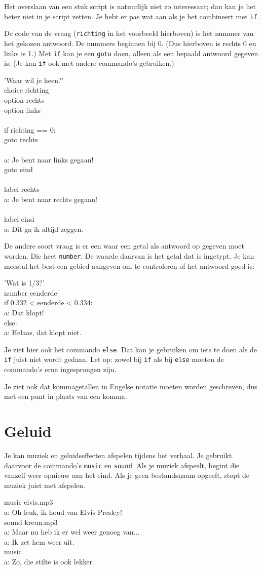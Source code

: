 \documentclass{article}
\newcommand\code[1]{\par\noindent\begin{texttt}#1\end{texttt}\par}
\begin{document}
Het overslaan van een stuk script is natuurlijk niet zo interessant; dan kan je
het beter niet in je script zetten. Je hebt er pas wat aan als je het
combineert met \verb-if-.

De code van de vraag (\verb-richting- in het voorbeeld hierboven) is het nummer
van het gekozen antwoord. De nummers beginnen bij 0. (Dus hierboven is rechts 0
en links is 1.) Met \verb-if- kan je een \verb-goto- doen, alleen als een
bepaald antwoord gegeven is. (Je kan \verb-if- ook met andere commando's
gebruiken.)
\code{'Waar wil je heen?'\\
choice richting\\
option rechts\\
option links\\
\\
if richting == 0:\\
  goto rechts\\
\\
a: Je bent naar links gegaan!\\
goto eind\\
\\
label rechts\\
a: Je bent naar rechts gegaan!\\
\\
label eind\\
a: Dit ga ik altijd zeggen.}

De andere soort vraag is er een waar een getal als antwoord op gegeven moet worden.
Die heet \verb-number-. De waarde daarvan is het getal dat is ingetypt. Je kan
meestal het best een gebied aangeven om te controleren of het antwoord goed is:
\code{'Wat is 1/3?'\\
number eenderde\\
if 0.332 < eenderde < 0.334:\\
  a: Dat klopt!\\
else:\\
  a: Helaas, dat klopt niet.}

Je ziet hier ook het commando \verb-else-. Dat kan je gebruiken om iets te doen
als de \verb-if- juist niet wordt gedaan. Let op: zowel bij \verb-if- als bij
\verb-else- moeten de commando's erna ingesprongen zijn.

Je ziet ook dat kommagetallen in Engelse notatie moeten worden geschreven, dus
met een punt in plaats van een komma.

\section{Geluid}
Je kan muziek en geluidseffecten afspelen tijdens het verhaal. Je gebruikt
daarvoor de commando's \verb-music- en \verb-sound-. Als je muziek afspeelt,
begint die vanzelf weer opnieuw aan het eind. Als je geen bestandsnaam opgeeft,
stopt de muziek juist met afspelen.
\code{music elvis.mp3\\
a: Oh leuk, ik houd van Elvis Presley!\\
sound kreun.mp3\\
a: Maar nu heb ik er wel weer genoeg van...\\
a: Ik zet hem weer uit.\\
music\\
a: Zo, die stilte is ook lekker.}
\end{document}
